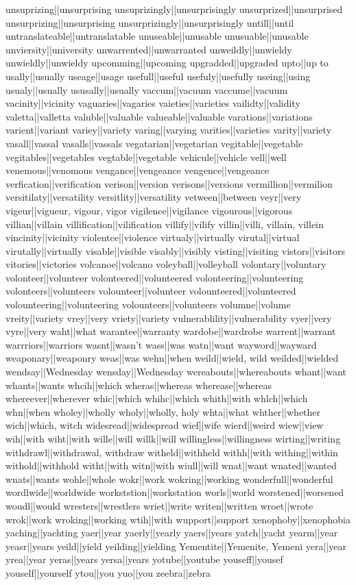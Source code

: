 unsuprizing||unsurprising
unsuprizingly||unsurprisingly
unsurprized||unsurprised
unsurprizing||unsurprising
unsurprizingly||unsurprisingly
untill||until
untranslateable||untranslatable
unuseable||unusable
unusuable||unusable
unviersity||university
unwarrented||unwarranted
unweildly||unwieldy
unwieldly||unwieldy
upcomming||upcoming
upgradded||upgraded
upto||up to
usally||usually
useage||usage
usefull||useful
usefuly||usefully
useing||using
usualy||usually
ususally||usually
vaccum||vacuum
vaccume||vacuum
vacinity||vicinity
vaguaries||vagaries
vaieties||varieties
vailidty||validity
valetta||valletta
valuble||valuable
valueable||valuable
varations||variations
varient||variant
variey||variety
varing||varying
varities||varieties
varity||variety
vasall||vassal
vasalls||vassals
vegatarian||vegetarian
vegitable||vegetable
vegitables||vegetables
vegtable||vegetable
vehicule||vehicle
vell||well
venemous||venomous
vengance||vengeance
vengence||vengeance
verfication||verification
verison||version
verisons||versions
vermillion||vermilion
versitilaty||versatility
versitlity||versatility
vetween||between
veyr||very
vigeur||vigueur, vigour, vigor
vigilence||vigilance
vigourous||vigorous
villian||villain
villification||vilification
villify||vilify
villin||villi, villain, villein
vincinity||vicinity
violentce||violence
virtualy||virtually
virutal||virtual
virutally||virtually
visable||visible
visably||visibly
visting||visiting
vistors||visitors
vitories||victories
volcanoe||volcano
voleyball||volleyball
volontary||voluntary
volonteer||volunteer
volonteered||volunteered
volonteering||volunteering
volonteers||volunteers
volounteer||volunteer
volounteered||volunteered
volounteering||volunteering
volounteers||volunteers
volumne||volume
vreity||variety
vrey||very
vriety||variety
vulnerablility||vulnerability
vyer||very
vyre||very
waht||what
warantee||warranty
wardobe||wardrobe
warrent||warrant
warrriors||warriors
wasnt||wasn't
wass||was
watn||want
wayword||wayward
weaponary||weaponry
weas||was
wehn||when
weild||wield, wild
weilded||wielded
wendsay||Wednesday
wensday||Wednesday
wereabouts||whereabouts
whant||want
whants||wants
whcih||which
wheras||whereas
wherease||whereas
whereever||wherever
whic||which
whihc||which
whith||with
whlch||which
whn||when
wholey||wholly
wholy||wholly, holy
whta||what
whther||whether
wich||which, witch
widesread||widespread
wief||wife
wierd||weird
wiew||view
wih||with
wiht||with
wille||will
willk||will
willingless||willingness
wirting||writing
withdrawl||withdrawal, withdraw
witheld||withheld
withh||with
withing||within
withold||withhold
witht||with
witn||with
wiull||will
wnat||want
wnated||wanted
wnats||wants
wohle||whole
wokr||work
wokring||working
wonderfull||wonderful
wordlwide||worldwide
workststion||workstation
worls||world
worstened||worsened
woudl||would
wresters||wrestlers
wriet||write
writen||written
wroet||wrote
wrok||work
wroking||working
wtih||with
wupport||support
xenophoby||xenophobia
yaching||yachting
yaer||year
yaerly||yearly
yaers||years
yatch||yacht
yearm||year
yeasr||years
yeild||yield
yeilding||yielding
Yementite||Yemenite, Yemeni
yera||year
yrea||year
yeras||years
yersa||years
yotube||youtube
youseff||yousef
youself||yourself
ytou||you
yuo||you
zeebra||zebra
